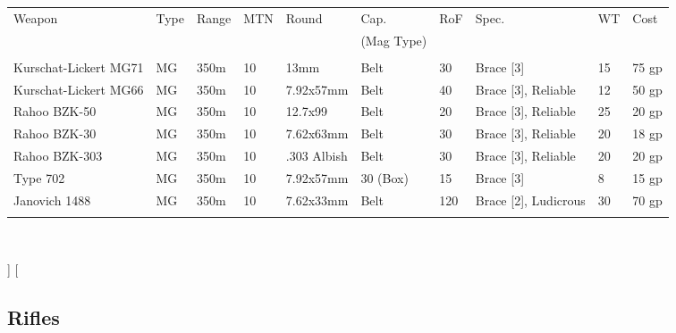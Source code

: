 \documentclass[a4paper, twocolumn, openany]{book}
\begin{document}
{{	{\centering
	\begin{tabular}{p{2.5cm}lllp{2cm}llp{2cm}ll}
	Weapon & Type & Range & MTN & Round & Cap. & RoF & Spec. & WT & Cost\\ 
	&&&&& (Mag Type) \\ \hline \\
	Kurschat-Lickert MG71 	& MG & 350m & 10 & 13mm 		& Belt 		& 30 	& Brace [3] 			& 15 	& 75 gp \\
	Kurschat-Lickert MG66 	& MG & 350m & 10 & 7.92x57mm 	& Belt 		& 40 	& Brace [3], Reliable 	& 12 	& 50 gp \\
	Rahoo BZK-50 			& MG & 350m & 10 & 12.7x99 		& Belt 		& 20 	& Brace [3], Reliable 	& 25 	& 20 gp \\
	Rahoo BZK-30 			& MG & 350m & 10 & 7.62x63mm 	& Belt 		& 30 	& Brace [3], Reliable 	& 20 	& 18 gp \\
	Rahoo BZK-303 			& MG & 350m & 10 & .303 Albish 	& Belt 		& 30 	& Brace [3], Reliable 	& 20 	& 20 gp \\
	Type 702 				& MG & 350m & 10 & 7.92x57mm 	& 30 (Box) 	& 15 	& Brace [3] 			& 8 	& 15 gp \\
	Janovich 1488 			& MG & 350m & 10 & 7.62x33mm 	& Belt 		& 120 	& Brace [2], Ludicrous 	& 30 	& 70 gp \\
	\\ \hline
	\end{tabular}\\[2\baselineskip] }
}]
\twocolumn[{
	\subsection{Rifles}

}}
\end{document}

